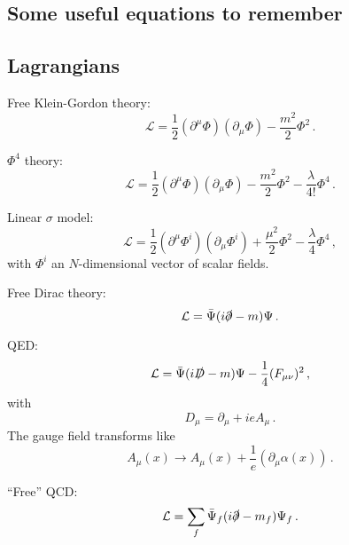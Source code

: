 \documentclass[12pt]{memoir}
\begin{document}
\begin{appendices}
  \chapter{Some useful equations to remember}

  \section{Lagrangians}

  Free Klein-Gordon theory:
  \begin{equation}\label{eq:kg_free}
    \mathcal{L} = \frac{1}{2}(\partial^{\mu} \Phi)(\partial_{\mu} \Phi) - \frac{m^2}{2} \Phi^2\,.
  \end{equation}

  $\Phi^4$ theory:
  \begin{equation}\label{eq:phi4}
    \mathcal{L} = \frac{1}{2}(\partial^{\mu} \Phi)(\partial_{\mu} \Phi) - \frac{m^2}{2} \Phi^2 - \frac{\lambda}{4!} \Phi^4\,.
  \end{equation}

  Linear $\sigma$ model:
  \begin{equation}\label{eq:linear_sigma_model}
    \mathcal{L} = \frac{1}{2}(\partial^{\mu} \Phi^i)(\partial_{\mu} \Phi^i) + \frac{\mu^2}{2} \Phi^2 - \frac{\lambda}{4} \Phi^4\,,
  \end{equation}
  with $\Phi^i$ an $N$-dimensional vector of scalar fields.

  Free Dirac theory:
  \begin{equation}\label{eq:dirac_free}
    \mathcal{L} = \bar{\Psi}(i\slashed{\partial} - m)\Psi\,.
  \end{equation}

  QED:
  \begin{equation}\label{eq:qed}
    \mathcal{L} = \bar{\Psi}(i\slashed{D} - m)\Psi - \frac{1}{4}(F_{\mu\nu})^2 \,,
  \end{equation}
  with
  \begin{equation}\label{eq:qed_cov_deriv}
    D_{\mu} = \partial_{\mu} + i e A_{\mu}\,.
  \end{equation}
  The gauge field transforms like
  \begin{equation}
    A_{\mu}(x) \rightarrow A_{\mu}(x) + \frac{1}{e} (\partial_{\mu} \alpha(x))\,.
  \end{equation}

  ``Free'' QCD:
  \begin{equation}
    \mathcal{L} = \sum_f \bar{\Psi}_f (i\slashed{\partial} - m_f) \Psi_f \,.
  \end{equation}


\end{appendices}
\end{document}
